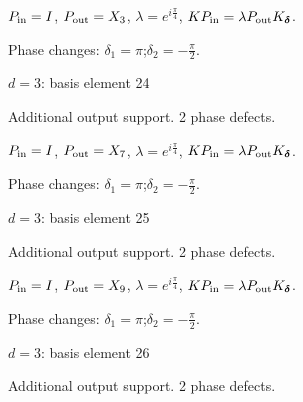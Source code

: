 \vspace{-1mm}
$P_{\rm in}=I$, \quad $P_{\rm out}=X_{3}$, \quad $\lambda=e^{i\frac{\pi}{4}}$, \qquad $K P_{\rm in}=\lambda P_{\rm out}K_{\boldsymbol\delta}$.
\par\smallskip\begin{minipage}{.98\linewidth}\small Phase changes: $\delta_{1}=\pi$;\quad $\delta_{2}=-\frac{\pi}{2}$.\end{minipage}
\vfill
{\footnotesize\texttt{}}
\newpage
{}
{\Large $d=3$: basis element 24}\par
Additional output support. 2 phase defects.
\begin{center}
\end{center}
\vspace{-1mm}
$P_{\rm in}=I$, \quad $P_{\rm out}=X_{7}$, \quad $\lambda=e^{i\frac{\pi}{4}}$, \qquad $K P_{\rm in}=\lambda P_{\rm out}K_{\boldsymbol\delta}$.
\par\smallskip\begin{minipage}{.98\linewidth}\small Phase changes: $\delta_{1}=\pi$;\quad $\delta_{2}=-\frac{\pi}{2}$.\end{minipage}
\vfill
{\footnotesize\texttt{}}
\newpage
{}
{\Large $d=3$: basis element 25}\par
Additional output support. 2 phase defects.
\begin{center}
\end{center}
\vspace{-1mm}
$P_{\rm in}=I$, \quad $P_{\rm out}=X_{9}$, \quad $\lambda=e^{i\frac{\pi}{4}}$, \qquad $K P_{\rm in}=\lambda P_{\rm out}K_{\boldsymbol\delta}$.
\par\smallskip\begin{minipage}{.98\linewidth}\small Phase changes: $\delta_{1}=\pi$;\quad $\delta_{2}=-\frac{\pi}{2}$.\end{minipage}
\vfill
{\footnotesize\texttt{}}
\newpage
{}
{\Large $d=3$: basis element 26}\par
Additional output support. 2 phase defects.
\begin{center}
\end{center}
\vspace{-1mm}
